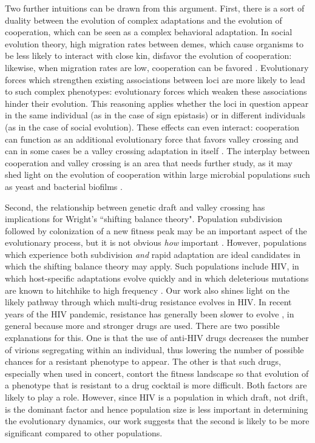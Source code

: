 \documentclass[rmp]{revtex4}
\begin{document}
\begin{spacing}{1.5}
Two further intuitions can be drawn from this argument.
First, there is a sort of duality between the evolution of complex adaptations and the evolution of cooperation, which can be seen as a complex behavioral adaptation.
In social evolution theory, high migration rates between demes, which cause organisms to be less likely to interact with close kin, disfavor the evolution of cooperation: likewise, when migration rates are low, cooperation can be favored \citep{van_cleve_2015}.
Evolutionary forces which strengthen existing associations between loci are more likely to lead to such complex phenotypes: evolutionary forces which weaken these associations hinder their evolution.
This reasoning applies whether the loci in question appear in the same individual (as in the case of sign epistasis) or in different individuals (as in the case of social evolution).
These effects can even interact: cooperation can function as an additional evolutionary force that favors valley crossing \citep{Obolski:Lewin-Epstein:2017} and can in some cases be a valley crossing adaptation in itself \citep{van_cleve_2013}.
The interplay between cooperation and valley crossing is an area that needs further study, as it may shed light on the evolution of cooperation within large microbial populations such as yeast \citep{gore_2009, gore_2013} and bacterial biofilms \citep{rainey_2003, van_gestel_2014}.

Second, the relationship between genetic draft and valley crossing has implications for Wright's ``shifting balance theory".
Population subdivision followed by colonization of a new fitness peak may be an important aspect of the evolutionary process, but it is not obvious \emph{how} important \citep{coyne_barton_turelli_2000}.
However, populations which experience both subdivision \emph{and} rapid adaptation are ideal candidates in which the shifting balance theory may apply.
Such populations include HIV, in which host-specific adaptations evolve quickly \citep{zhang_1997, wain_2007, dapp_2017, theys_2018} and in which deleterious mutations are known to hitchhike to high frequency \citep{zanini_2013, zanini_2015}.
Our work also shines light on the likely pathway through which multi-drug resistance evolves in HIV.
In recent years of the HIV pandemic, resistance has generally been slower to evolve \citep{feder_2015}, in general because more and stronger drugs are used.
There are two possible explanations for this.
One is that the use of anti-HIV drugs decreases the number of virions segregating within an individual, thus lowering the number of possible chances for a resistant phenotype to appear.
The other is that such drugs, especially when used in concert, contort the fitness landscape so that evolution of a phenotype that is resistant to a drug cocktail is more difficult.
Both factors are likely to play a role.
However, since HIV is a population in which draft, not drift, is the dominant factor and hence population size is less important in determining the evolutionary dynamics, our work suggests that the second is likely to be more significant compared to other populations.


\end{spacing}
\end{document}

